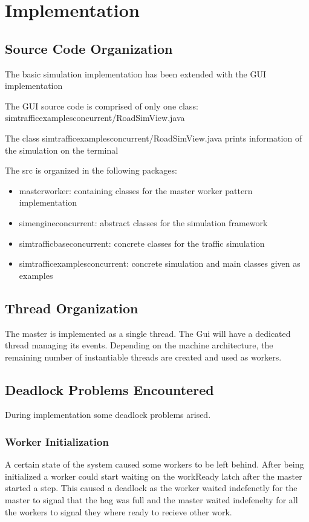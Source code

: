 \documentclass[12pt, a4paper]{report}
\begin{document}
\chapter{Implementation}

\section{Source Code Organization}
The basic simulation implementation has been extended with the GUI implementation

The GUI source code is comprised of only one class: simtrafficexamplesconcurrent/RoadSimView.java

The class simtrafficexamplesconcurrent/RoadSimView.java prints information of the simulation on the terminal

The src is organized in the following packages:
\begin{itemize}
    \item masterworker: containing classes for the master worker pattern implementation
    \item simengineconcurrent: abstract classes for the simulation framework
    \item simtrafficbaseconcurrent: concrete classes for the traffic simulation
    \item simtrafficexamplesconcurrent: concrete simulation and main classes given as examples
\end{itemize}

\section{Thread Organization} %
The master is implemented as a single thread. The Gui will have a dedicated thread
 managing its events. Depending on the machine architecture, the remaining number
 of instantiable threads are created and used as workers.

\section{Deadlock Problems Encountered}
During implementation some deadlock problems arised.

\subsection{Worker Initialization}
A certain state of the system caused some workers to be left behind.
 After being initialized a worker could start waiting on the workReady latch after
 the master started a step. This caused a deadlock as the worker waited indefenetly
 for the master to signal that the bag was full and the master waited indefenelty for
 all the workers to signal they where ready to recieve other work.
\end{document}
